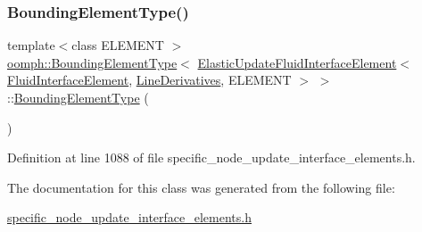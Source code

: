\subsubsection{\texorpdfstring{Bounding\+Element\+Type()}{BoundingElementType()}}
{\footnotesize\ttfamily template$<$class E\+L\+E\+M\+E\+NT $>$ \\
\hyperlink{classoomph_1_1BoundingElementType}{oomph\+::\+Bounding\+Element\+Type}$<$ \hyperlink{classoomph_1_1ElasticUpdateFluidInterfaceElement}{Elastic\+Update\+Fluid\+Interface\+Element}$<$ \hyperlink{classoomph_1_1FluidInterfaceElement}{Fluid\+Interface\+Element}, \hyperlink{classoomph_1_1LineDerivatives}{Line\+Derivatives}, E\+L\+E\+M\+E\+NT $>$ $>$\+::\hyperlink{classoomph_1_1BoundingElementType}{Bounding\+Element\+Type} (\begin{DoxyParamCaption}{ }\end{DoxyParamCaption})\hspace{0.3cm}{\ttfamily [inline]}}



Definition at line 1088 of file specific\+\_\+node\+\_\+update\+\_\+interface\+\_\+elements.\+h.



The documentation for this class was generated from the following file\+:\begin{DoxyCompactItemize}
\item 
\hyperlink{specific__node__update__interface__elements_8h}{specific\+\_\+node\+\_\+update\+\_\+interface\+\_\+elements.\+h}\end{DoxyCompactItemize}
